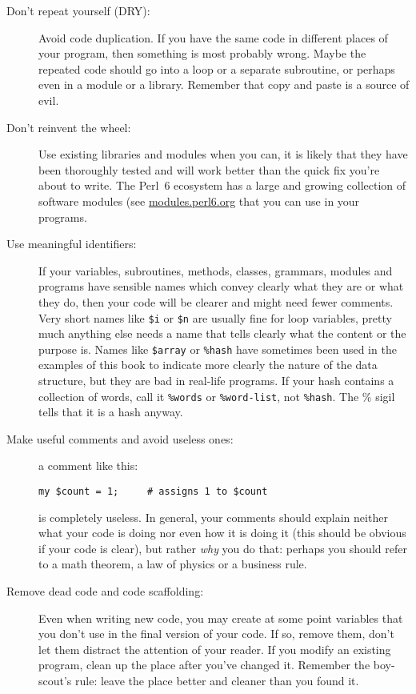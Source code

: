 \begin{description}

\item[Don't repeat yourself (DRY):] Avoid code duplication. 
If you have the same code in different places of your 
program, then something is most probably wrong. Maybe 
the repeated code should go into a loop or a separate 
subroutine, or perhaps even in a module or a library. 
Remember that copy and paste is a source of evil.

\item[Don't reinvent the wheel:] Use existing libraries 
and modules when you can, it is likely that they have 
been thoroughly tested and will work better than the 
quick fix you're about to write. The Perl~6 ecosystem 
has a large and growing collection of software modules 
(see \url{modules.perl6.org} that you can use in your 
programs.

\item[Use meaningful identifiers:] If your variables, 
subroutines, methods, classes, grammars, modules 
and programs have sensible 
names which convey clearly what they are or what they do, 
then your code will be clearer and might need fewer 
comments. Very short names like \verb'$i' or \verb'$n' are 
usually fine for loop variables, pretty much anything else needs 
a name that tells clearly what the content or the purpose is. 
Names like \verb'$array' or \verb'%hash' have sometimes been 
used in the examples of this book to indicate more clearly 
the nature of the data structure, but they are bad in 
real-life programs. If your hash contains a collection of 
words, call it \verb'%words' or \verb'%word-list', not 
\verb'%hash'. The \% sigil tells that it is a hash anyway.

\item[Make useful comments and avoid useless ones:] a 
comment like this:
\begin{verbatim}
my $count = 1;     # assigns 1 to $count
\end{verbatim}
is completely useless. In general, your comments should 
explain neither what your code is doing nor even how it is doing 
it (this should be obvious if your code is clear), but 
rather \emph{why} you do that: perhaps you should refer 
to a math theorem, a law of physics or a business rule.

\item[Remove dead code and code scaffolding:] Even when 
writing new code, you may create at some point variables 
that you don't use in the final version of your code. If so, 
remove them, don't let them distract the attention of your 
reader. If you modify an existing program, clean up the place 
after you've changed it. Remember the boy-scout's rule: 
leave the place better and cleaner than you found it.


\end{description}
